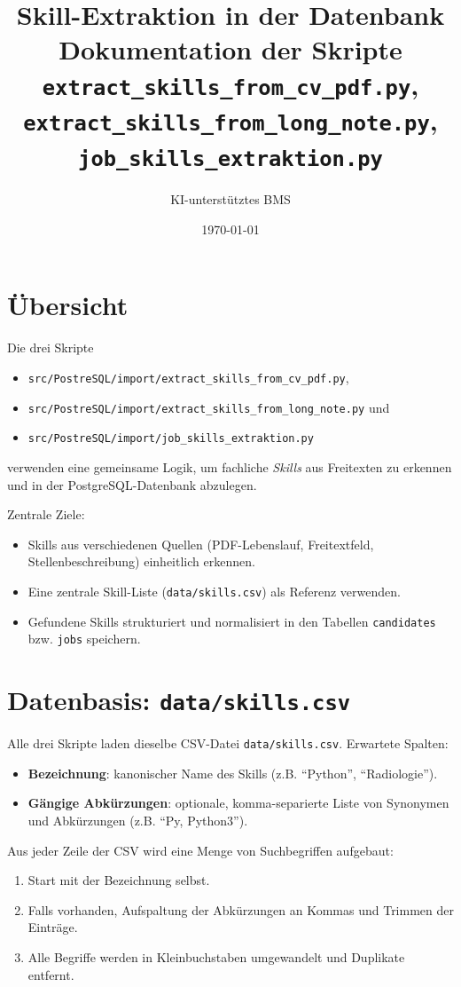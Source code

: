 \documentclass[12pt,a4paper]{article}
\title{Skill-Extraktion in der Datenbank\\[0.5em]
\large Dokumentation der Skripte\\
\texttt{extract\_skills\_from\_cv\_pdf.py}, \\
\texttt{extract\_skills\_from\_long\_note.py}, \\
\texttt{job\_skills\_extraktion.py}}
\author{KI-unterstütztes BMS}
\date{\today}
\begin{document}
\maketitle
\tableofcontents
\newpage

\section{Übersicht}

Die drei Skripte
\begin{itemize}
    \item \texttt{src/PostreSQL/import/extract\_skills\_from\_cv\_pdf.py},
    \item \texttt{src/PostreSQL/import/extract\_skills\_from\_long\_note.py} und
    \item \texttt{src/PostreSQL/import/job\_skills\_extraktion.py}
\end{itemize}
verwenden eine gemeinsame Logik, um fachliche \emph{Skills} aus Freitexten zu erkennen und in der PostgreSQL-Datenbank abzulegen.

Zentrale Ziele:
\begin{itemize}
    \item Skills aus verschiedenen Quellen (PDF-Lebenslauf, Freitextfeld, Stellenbeschreibung) einheitlich erkennen.
    \item Eine zentrale Skill-Liste (\texttt{data/skills.csv}) als Referenz verwenden.
    \item Gefundene Skills strukturiert und normalisiert in den Tabellen \texttt{candidates} bzw. \texttt{jobs} speichern.
\end{itemize}

\section{Datenbasis: \texttt{data/skills.csv}}

Alle drei Skripte laden dieselbe CSV-Datei \texttt{data/skills.csv}. Erwartete Spalten:
\begin{itemize}
    \item \textbf{Bezeichnung}: kanonischer Name des Skills (z.B. ``Python'', ``Radiologie'').
    \item \textbf{Gängige Abkürzungen}: optionale, komma-separierte Liste von Synonymen und Abkürzungen
          (z.B. ``Py, Python3'').
\end{itemize}

Aus jeder Zeile der CSV wird eine Menge von Suchbegriffen aufgebaut:
\begin{enumerate}
    \item Start mit der Bezeichnung selbst.
    \item Falls vorhanden, Aufspaltung der Abkürzungen an Kommas und Trimmen der Einträge.
    \item Alle Begriffe werden in Kleinbuchstaben umgewandelt und Duplikate entfernt.
\end{enumerate}
\end{document}
